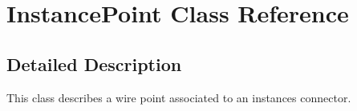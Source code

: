 \hypertarget{class_instance_point}{}\section{Instance\+Point Class Reference}
\label{class_instance_point}


\subsection{Detailed Description}
This class describes a wire point associated to an instance\textquotesingle{}s connector. 